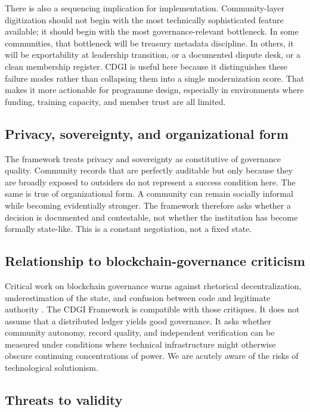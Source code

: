 \documentclass[review,onecolumn]{elsarticle}
\begin{document}
There is also a sequencing implication for implementation. Community-layer digitization should not begin with the most technically sophisticated feature available; it should begin with the most governance-relevant bottleneck. In some communities, that bottleneck will be treasury metadata discipline. In others, it will be exportability at leadership transition, or a documented dispute desk, or a clean membership register. CDGI is useful here because it distinguishes these failure modes rather than collapsing them into a single modernization score. That makes it more actionable for programme design, especially in environments where funding, training capacity, and member trust are all limited.

\subsection{Privacy, sovereignty, and organizational form}

The framework treats privacy and sovereignty as constitutive of governance quality. Community records that are perfectly auditable but only because they are broadly exposed to outsiders do not represent a success condition here. The same is true of organizational form. A community can remain socially informal while becoming evidentially stronger. The framework therefore asks whether a decision is documented and contestable, not whether the institution has become formally state-like. This is a constant negotiation, not a fixed state.

\subsection{Relationship to blockchain-governance criticism}

Critical work on blockchain governance warns against rhetorical decentralization, underestimation of the state, and confusion between code and legitimate authority \cite{atzori2017, schneider2019}. The CDGI Framework is compatible with those critiques. It does not assume that a distributed ledger yields good governance. It asks whether community autonomy, record quality, and independent verification can be measured under conditions where technical infrastructure might otherwise obscure continuing concentrations of power. We are acutely aware of the risks of technological solutionism.

\subsection{Threats to validity}
\end{document}
